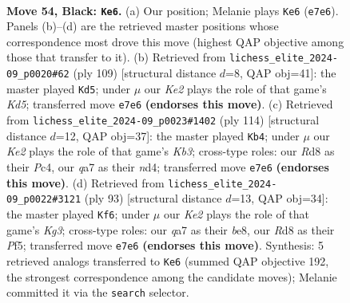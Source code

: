 \documentclass[11pt]{article}
\begin{document}
\clearpage

\begin{figure}[p]\centering
\begin{subfigure}{0.46\textwidth}\centering
\resizebox{\linewidth}{!}{%
\newchessgame
\chessboard[
  setfen={3r4/Q3k3/8/8/4P3/8/6PP/1K6 b - - 4 54},
  showmover=false,
  pgfstyle=straightmove, color=movearrow, markmove={e7-e6}
]}
\caption{}
\end{subfigure}\hfill
\begin{subfigure}{0.46\textwidth}\centering
\resizebox{\linewidth}{!}{%
\newchessgame
\chessboard[
  setfen={8/8/1Q6/4r3/3k4/7P/8/6K1 b - - 2 55},
  showmover=false,
  pgfstyle=straightmove, color=movearrow, markmove={d4-d5}
]}
\caption{}
\end{subfigure}
\\[4pt]
\begin{subfigure}{0.46\textwidth}\centering
\resizebox{\linewidth}{!}{%
\newchessgame
\chessboard[
  setfen={6R1/8/3p4/8/2Pnp3/1K6/5k2/8 w - - 1 58},
  showmover=false,
  pgfstyle=straightmove, color=movearrow, markmove={b3-b4}
]}
\caption{}
\end{subfigure}\hfill
\begin{subfigure}{0.46\textwidth}\centering
\resizebox{\linewidth}{!}{%
\newchessgame
\chessboard[
  setfen={4B3/8/P5k1/5p2/1K3P2/7r/8/8 b - - 1 47},
  showmover=false,
  pgfstyle=straightmove, color=movearrow, markmove={g6-f6}
]}
\caption{}
\end{subfigure}
\caption{\textbf{Move 54, Black: \texttt{Ke6}.} (a) Our position; Melanie plays \texttt{Ke6} (\texttt{e7e6}). Panels (b)--(d) are the retrieved master positions whose correspondence most drove this move (highest QAP objective among those that transfer to it). (b) Retrieved from \texttt{lichess\_elite\_2024-09\_p0020\#62} (ply 109) [structural distance $d$=8, QAP obj=41]: the master played \texttt{Kd5}; under $\mu$ our \emph{Ke2} plays the role of that game's \emph{Kd5}; transferred move \texttt{e7e6} \textbf{(endorses this move)}. (c) Retrieved from \texttt{lichess\_elite\_2024-09\_p0023\#1402} (ply 114) [structural distance $d$=12, QAP obj=37]: the master played \texttt{Kb4}; under $\mu$ our \emph{Ke2} plays the role of that game's \emph{Kb3}; cross-type roles: our \emph{R}d8 as their \emph{P}c4, our \emph{q}a7 as their \emph{n}d4; transferred move \texttt{e7e6} \textbf{(endorses this move)}. (d) Retrieved from \texttt{lichess\_elite\_2024-09\_p0022\#3121} (ply 93) [structural distance $d$=13, QAP obj=34]: the master played \texttt{Kf6}; under $\mu$ our \emph{Ke2} plays the role of that game's \emph{Kg3}; cross-type roles: our \emph{q}a7 as their \emph{b}e8, our \emph{R}d8 as their \emph{P}f5; transferred move \texttt{e7e6} \textbf{(endorses this move)}. Synthesis: 5 retrieved analogs transferred to \texttt{Ke6} (summed QAP objective 192, the strongest correspondence among the candidate moves); Melanie committed it via the \texttt{search} selector.}
\label{fig:thought-m107}
\end{figure}
\end{document}
